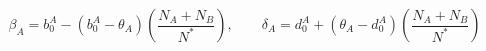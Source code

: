 
\begin{equation}
\beta_{A}=b_{0}^{A}-(b_{0}^{A}-\theta_{A})\left(\frac{N_A+N_B}{N^{*}}\right), \quad\quad \delta_{A}=d_{0}^{A}+(\theta_{A}-d_{0}^{A})\left(\frac{N_A+N_B}{N^{*}}\right)
\end{equation}

